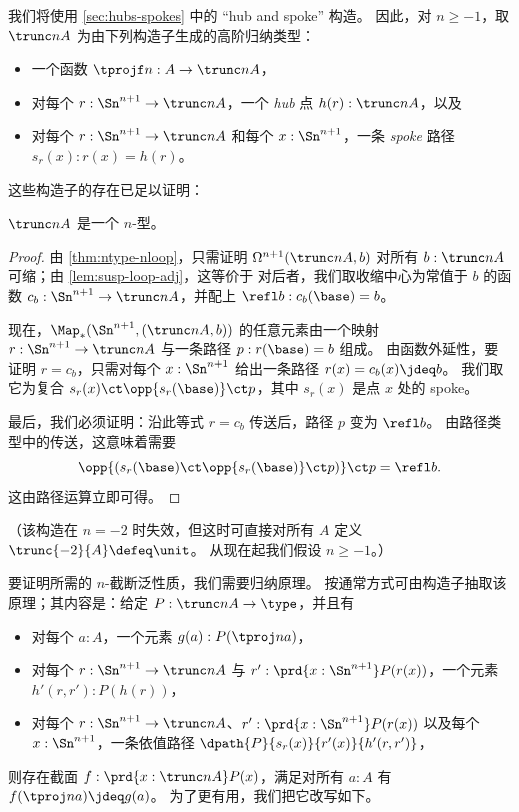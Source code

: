 %
我们将使用 \cref{sec:hubs-spokes} 中的 ``hub and spoke'' 构造。
因此，对 $n\ge -1$，取 $\trunc nA$ 为由下列构造子生成的高阶归纳类型：
\begin{itemize}
\item 一个函数 $\tprojf n : A \to \trunc n A$，
\item 对每个 $r:\Sn^{n+1} \to \trunc n A$，一个 \emph{hub} 点 $h(r):\trunc n A$，以及
\item 对每个 $r:\Sn^{n+1} \to \trunc n A$ 和每个 $x:\Sn^{n+1}$，一条 \emph{spoke} 路径 $s_r(x):r(x) = h(r)$。
\end{itemize}

\noindent
这些构造子的存在已足以证明：

\begin{lem}
  $\trunc n A$ 是一个 $n$-型。
\end{lem}
\begin{proof}
  由 \cref{thm:ntype-nloop}，只需证明 $\Omega ^{n+1}(\trunc nA,b)$ 对所有 $b:\trunc nA$ 可缩；由
\cref{lem:susp-loop-adj}，这等价于 
  对后者，我们取收缩中心为常值于 $b$ 的函数 $c_b:\Sn^{n+1} \to \trunc nA$，并配上
$\refl b : c_b(\base) = b$。

  现在，$\Map_*(\Sn^{n+1},(\trunc nA,b))$ 的任意元素由一个映射 $r:\Sn^{n+1} \to \trunc n A$ 与一条路径
$p:r(\base)=b$ 组成。
  由函数外延性，要证明 $r = c_b$，只需对每个 $x:\Sn^{n+1}$ 给出一条路径 $r(x)=c_b(x) \jdeq b$。
  我们取它为复合 $s_r(x) \ct \opp{s_r(\base)} \ct p$，其中 $s_r(x)$ 是点 $x$ 处的 spoke。


  最后，我们必须证明：沿此等式 $r=c_b$ 传送后，路径 $p$ 变为 $\refl b$。
  由路径类型中的传送，这意味着需要
  \[\opp{(s_r(\base) \ct \opp{s_r(\base)} \ct p)} \ct p = \refl b.\]
  这由路径运算立即可得。
\end{proof}

（该构造在 $n=-2$ 时失效，但这时可直接对所有 $A$ 定义 $\trunc{-2}{A}\defeq \unit$。
从现在起我们假设 $n\ge -1$。）

%
要证明所需的 $n$-截断泛性质，我们需要归纳原理。
按通常方式可由构造子抽取该原理；其内容是：给定 $P:\trunc nA\to\type$，并且有
\begin{itemize}
\item 对每个 $a:A$，一个元素 $g(a) : P(\tproj na)$，
\item 对每个 $r:\Sn^{n+1} \to \trunc n A$ 与 $r':\prd{x:\Sn^{n+1}} P(r(x))$，一个元素 $h'(r,r'):P(h(r))$，
\item 对每个 $r:\Sn^{n+1} \to \trunc n A$、$r':\prd{x:\Sn^{n+1}} P(r(x))$ 以及每个 $x:\Sn^{n+1}$，一条依值路径
$\dpath{P}{s_r(x)}{r'(x)}{h'(r,r')}$，
\end{itemize}
则存在截面 $f:\prd{x:\trunc n A} P(x)$，满足对所有 $a:A$ 有 $f(\tproj n a) \jdeq g(a)$。
为了更有用，我们把它改写如下。

